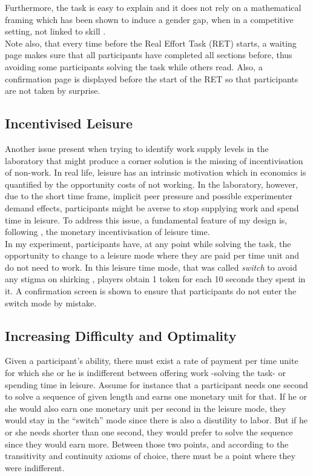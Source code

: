    Furthermore, the task is easy to explain and it does not rely on a mathematical framing which has been shown to induce a gender gap, when in a competitive setting, not linked to skill \citep{niederle2010}.\\ 
    
    Note also, that every time before the Real Effort Task (RET) starts, a waiting page makes sure that all participants have completed all sections before, thus avoiding some participants solving the task while others read. Also, a confirmation page is displayed before the start of the RET so that participants are not taken by surprise.
    
    \subsection{Incentivised Leisure}
    \label{ss:switch_mode}
    
    Another issue present when trying to identify work supply levels in the laboratory that might produce a corner solution is the missing of incentivisation of non-work. In real life, leisure has an intrinsic motivation which in economics is quantified by the opportunity costs of not working. In the laboratory, however, due to the short time frame, implicit peer pressure and possible experimenter demand effects, participants might be averse to stop supplying work and spend time in leisure. To address this issue, a fundamental feature of my design is, following \cite{sausgruber} , the monetary incentivisation of leisure time.\\
    
    In my experiment, participants have, at any point while solving the task, the opportunity to change to a leisure mode where they are paid per time unit and do not need to work. In this leisure time mode, that was called \textit{switch} to avoid any stigma on shirking \citep{rey-biel2016, eriksson2009}, players obtain 1 token for each 10 seconds they spent in it. A confirmation screen is shown to ensure that participants do not enter the switch mode by mistake.
    
    \subsection{Increasing Difficulty and Optimality}
    
    Given a participant's ability, there must exist a rate of payment per time unite for which she or he is indifferent between offering work -solving the task- or spending time in leisure. Assume for instance that a participant needs one second to solve a sequence of given length and earns one monetary unit for that. If he or she would also earn one monetary unit per second in the leisure mode, they would stay in the ``switch'' mode since there is also a disutility to labor. But if he or she needs shorter than one second, they would prefer to solve the sequence since they would earn more. Between those two points, and according to the transitivity and continuity axioms of choice, there must be a point where they were indifferent.\\
    
